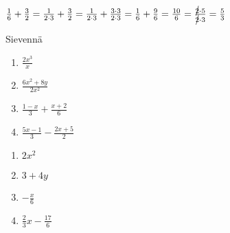 \begin{esimerkki}

$ \frac{1}{6} + \frac{3}{2} = \frac{1}{2\cdot 3} + \frac{3}{2} = \frac{1}{2 \cdot 3} + \frac{3 \cdot 3}{2 \cdot 3} = \frac{1}{6} + \frac{9}{6} = \frac{10}{6} = \frac{\cancel{2} \cdot 5}{\cancel{2} \cdot 3} = \frac{5}{3}$

\end{esimerkki}

\begin{tehtava}
Sievennä
\begin{enumerate}
\item $\frac{2x^3}{x}$
\item $\frac{6x^2+8y}{2x^2}$
\item $ \frac{1-x}{3} + \frac{x+2}{6}$
\item $ \frac{5x-1}{3} - \frac{2x+5}{2}$
\end{enumerate}
\begin{vastaus}
\begin{enumerate}
\item $2x^2$
\item $3+4y$
\item $ -\frac{x}{6}$
\item $ \frac{2}{3} x - \frac{17}{6}$
\end{enumerate}
\end{vastaus}
\end{tehtava}

